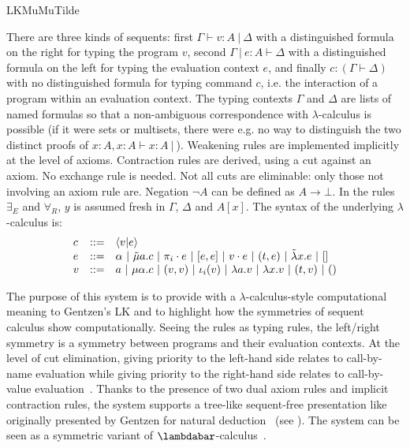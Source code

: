 \begin{entry}{LKMuMuTilde}
\begin{calculus}
\end{calculus}

\begin{clarifications}
There are three kinds of sequents: first $\Gamma \vdash v:A ~|~
\Delta$ with a distinguished formula on the right for typing the
program $v$, second $\Gamma ~|~ e:A \vdash \Delta$ with a
distinguished formula on the left for typing the evaluation context
$e$, and finally $c : (\Gamma \vdash \Delta)$ with no distinguished
formula for typing command $c$, i.e. the interaction of a program
within an evaluation context. The typing contexts $\Gamma$ and
$\Delta$ are lists of named formulas so that a non-ambiguous
correspondence with $\lambda$-calculus is possible (if it were sets or
multisets, there were e.g. no way to distinguish the two distinct
proofs of $x:A, x:A \vdash x:A ~|~$). Weakening rules are implemented
implicitly at the level of axioms. Contraction rules are derived,
using a cut against an axiom. No exchange rule is needed.  Not all
cuts are eliminable: only those not involving an axiom rule are.
Negation $\neg A$ can be defined as $A \rightarrow \bot$. In the rules
$\exists_E$ and $\forall_R$, $y$ is assumed fresh in $\Gamma$,
$\Delta$ and $A[x]$. The syntax of the underlying $\lambda$-calculus
is:
$$
\begin{array}{lll}
c & ::= & \langle v | e \rangle\\
e & ::= & \alpha ~|~ \tilde\mu a.c ~|~ \pi_i\cdot e ~|~ [e,e] ~|~ v \cdot e ~|~ (t,e) ~|~ \tilde\lambda x.e ~|~ []\\
v & ::= & a ~|~ \mu\alpha.c ~|~ (v,v) ~|~ \iota_i(v) ~|~ \lambda a.v ~|~ \lambda x.v ~|~ (t,v) ~|~ ()\\
\end{array}
$$
\end{clarifications}

\begin{history}
The purpose of this system is to provide with a
$\lambda$-calculus-style computational meaning to Gentzen's LK
 and to highlight how the symmetries of sequent
calculus show computationally. Seeing the rules as typing rules, the
left/right symmetry is a symmetry between programs and their
evaluation contexts. At the level of cut elimination, giving priority
to the left-hand side relates to call-by-name evaluation while giving
priority to the right-hand side relates to call-by-value
evaluation~\cite{CurienHerbelin00}. Thanks to the presence of two dual
axiom rules and implicit contraction rules, the system supports a
tree-like sequent-free presentation like originally presented by
Gentzen for natural deduction~\cite{HerbelinHdR} (see
). The system can be seen as a symmetric variant
of $\lambdabar$-calculus~.


\end{history}
\end{entry}
